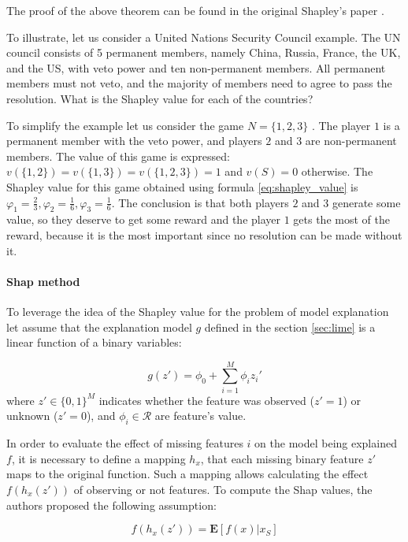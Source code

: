 The proof of the above theorem can be found in the original Shapley's paper \cite{ShapleyProof}. 

To illustrate, let us consider a United Nations Security Council example. The UN council consists of 5 permanent members, namely China, Russia, France, the UK, and the US, with veto power and ten non-permanent members. All permanent members must not veto, and the majority of members need to agree to pass the resolution.  What is the Shapley value for each of the countries? 

To simplify the example let us consider the game $N = \{1,2,3 \}$ . The player $1$ is a permanent member with the veto power, and players $2$ and $3$ are non-permanent members. The value of this game is expressed: $ v( \{1,2 \})= v( \{1,3 \})= v( \{1,2,3\})=1$ and $v(S)=0$ otherwise. 
The Shapley value for this game obtained using formula \ref{eq:shapley_value} is 
$\varphi_{1} = \frac{2}{3},\varphi_{2}= \frac{1}{6}, \varphi_{3 } =  \frac{1}{6} $.  The conclusion is that both players $2$ and $3$ generate some value, so they deserve to get some reward and the player $1$ gets the most of the reward, because it is the most important since no resolution can be made without it. 

\paragraph{Shap method} \mbox{}

To leverage the idea of the Shapley value for the problem of model explanation let assume that the explanation model $g$ defined in the section \ref{sec:lime} is a linear function of a binary variables: 

\begin{equation}
    g(z') = \phi_0 + \sum_{i=1}^{M} \phi_{i}z_i'
\end{equation}
where $z' \in \{ 0, 1\}^{M}$ indicates whether the feature was observed ($z'=1$) or unknown ($z'=0$), and $\phi_i \in \mathcal{R}$ are feature's value.

In order to evaluate the effect of missing features $i$ on the model being explained $f$, it is necessary to define a mapping $h_x$, that each missing binary feature $z'$ maps to the original function. Such a mapping allows calculating the effect $f(h_x(z'))$ of observing or not features. To compute the Shap values, the authors proposed \cite{shap} the following assumption: 

\begin{equation} \label{eq:shap assumtion}
    f(h_x(z')) = \mathbf{E}[f(x)|x_S]
\end{equation}

